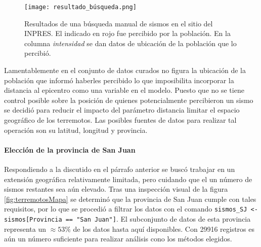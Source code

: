 \documentclass[a4paper]{report}
\begin{document}
\begin{figure}[!h]
\centering
\texttt{[image: resultado\_búsqueda.png]}
\caption{Resultados de una búsqueda manual de sismos en el sitio del INPRES. El indicado en rojo fue percibido por la población. En la columna \emph{intensidad} se dan datos de ubicación de la población que lo percibió.}
\label{fig:resultado_búsqueda}
\end{figure}

Lamentablemente en el conjunto de datos curados no figura la ubicación de la población que informó haberles percibido lo que imposibilita incorporar la distancia al epicentro como una variable en el modelo.%
Puesto que no se tiene control posible sobre la posición de quienes potencialmente percibieron un sismo se decidió para reducir el impacto del parámetro distancia limitar el espacio geográfico de los terremotos.
Las posibles fuentes de datos para realizar tal operación son su latitud, longitud y provincia.


\paragraph{Elección de la provincia de San Juan}
Respondiendo a la discutido en el párrafo anterior se buscó trabajar en un extensión geográfica relativamente limitada, pero cuidando que el un número de sismos restantes sea aún elevado.
Tras una inspección visual de la figura \ref{fig:terremotosMapa} se determinó  que la provincia de San Juan cumple con tales requisitos, por lo que se procedió a filtrar los datos con el comando \verb'sismos_SJ <- sismos[Provincia == "San Juan"]'.
El subconjunto de datos de esta provincia representa un \(\approx 53 \%\) de los datos hasta aquí disponibles.
Con \num{29916} registros es aún un número suficiente para realizar análisis cono los métodos elegidos.

\end{document}
